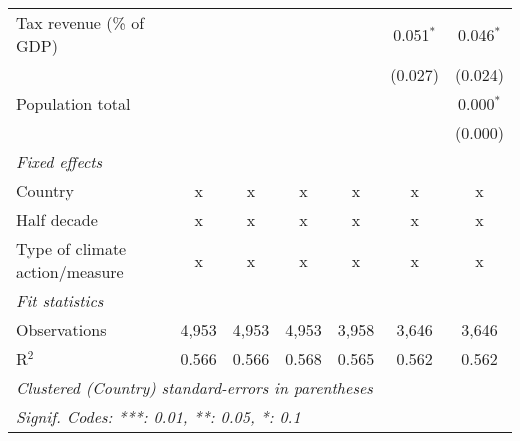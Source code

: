 \begin{tabular}{lcccccc}
   Tax revenue (\% of GDP)                        &         &         &                &                & 0.051$^{*}$    & 0.046$^{*}$\\   
                                                  &         &         &                &                & (0.027)        & (0.024)\\   
   Population total                               &         &         &                &                &                & 0.000$^{*}$\\   
                                                  &         &         &                &                &                & (0.000)\\   
   \emph{Fixed effects}\\
   Country                                        & x       & x       & x              & x              & x              & x\\  
   Half decade                                    & x       & x       & x              & x              & x              & x\\  
   Type of climate action/measure                 & x       & x       & x              & x              & x              & x\\  
   \midrule \emph{Fit statistics}\\
   Observations                                   & 4,953   & 4,953   & 4,953          & 3,958          & 3,646          & 3,646\\  
   R$^2$                                          & 0.566   & 0.566   & 0.568          & 0.565          & 0.562          & 0.562\\  
   \midrule
   \multicolumn{7}{l}{\emph{Clustered (Country) standard-errors in parentheses}}\\
   \multicolumn{7}{l}{\emph{Signif. Codes: ***: 0.01, **: 0.05, *: 0.1}}\\
\end{tabular}
\par\endgroup


